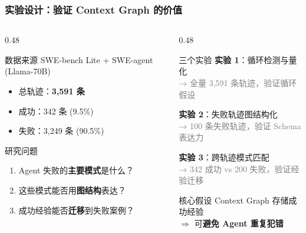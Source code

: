 \documentclass[aspectratio=169,10pt]{beamer}
\renewcommand{\footnotesize}{\tiny}
\begin{document}
\begin{frame}
  \frametitle{实验设计：验证 Context Graph 的价值}

  \begin{columns}[T]
    \begin{column}{0.48\textwidth}
      \begin{block}{数据来源}
        SWE-bench Lite + SWE-agent (Llama-70B)
        \begin{itemize}
          \item 总轨迹：\textbf{3,591 条}
          \item 成功：342 条 (9.5\%)
          \item 失败：3,249 条 (90.5\%)
        \end{itemize}
      \end{block}

      \begin{block}{研究问题}
        \begin{enumerate}
          \item Agent 失败的\textbf{主要模式}是什么？
          \item 这些模式能否用\textbf{图结构}表达？
          \item 成功经验能否\textbf{迁移}到失败案例？
        \end{enumerate}
      \end{block}
    \end{column}

    \begin{column}{0.48\textwidth}
      \begin{block}{三个实验}
        \footnotesize
        \textbf{实验 1}：循环检测与量化\\
        \textcolor{gray}{→ 全量 3,591 条轨迹，验证循环假设}

        \vspace{0.15cm}
        \textbf{实验 2}：失败轨迹图结构化\\
        \textcolor{gray}{→ 100 条失败轨迹，验证 Schema 表达力}

        \vspace{0.15cm}
        \textbf{实验 3}：跨轨迹模式匹配\\
        \textcolor{gray}{→ 342 成功 vs 200 失败，验证经验迁移}
      \end{block}

      \begin{alertblock}{核心假设}
        Context Graph 存储成功经验\\
        $\Rightarrow$ 可\textbf{避免 Agent 重复犯错}
      \end{alertblock}
    \end{column}
  \end{columns}
\end{frame}
\end{document}
